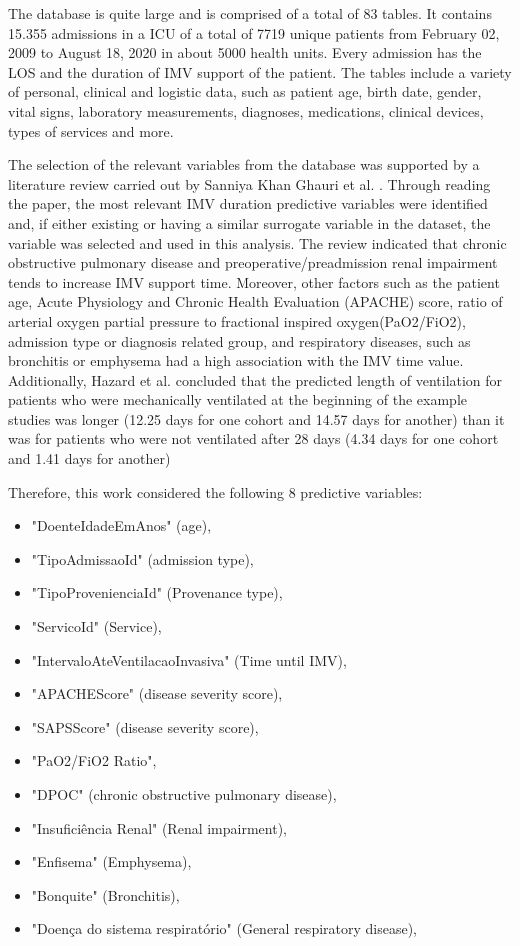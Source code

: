 \documentclass[journal]{IEEEtran} %
\begin{document}
The database is quite large and is comprised of a total of 83 tables. It contains 15.355 admissions in a ICU of a total of 7719 unique patients from February 02, 2009 to August 18, 2020 in about 5000 health units. Every admission has the LOS and the duration of IMV support of the patient. The tables include a variety of personal, clinical and logistic data, such as patient age, birth date, gender, vital signs, laboratory measurements, diagnoses, medications, clinical devices, types of services and more.

The selection of the relevant variables from the database was supported by a literature review carried out by Sanniya Khan Ghauri et al. \cite{Ghauri2019}. Through reading the paper, the most relevant IMV duration predictive variables were identified and, if either existing or having a similar surrogate variable in the dataset, the variable was selected and used in this analysis. The review indicated that chronic obstructive pulmonary disease and preoperative/preadmission renal impairment tends to increase IMV support time. Moreover, other factors such as the patient age, Acute Physiology and Chronic Health Evaluation (APACHE) score, ratio of arterial oxygen partial pressure to fractional inspired oxygen(PaO2/FiO2), admission type or diagnosis related group, and respiratory diseases, such as bronchitis or emphysema had a high association with the IMV time value. Additionally, Hazard et al. \cite{Hazard2020} concluded that the predicted length of ventilation for patients who were mechanically ventilated at the beginning of the example studies was longer (12.25 days for one cohort and 14.57 days for another) than it was for patients who were not ventilated after 28 days (4.34 days for one cohort and 1.41 days for another)

Therefore, this work considered the following 8 predictive variables:
\begin{itemize}
    \item "DoenteIdadeEmAnos" (age), 
    \item "TipoAdmissaoId" (admission type), 
    \item "TipoProvenienciaId" (Provenance type), 
    \item "ServicoId" (Service), 
    \item  "IntervaloAteVentilacaoInvasiva" (Time until IMV),
    \item "APACHEScore" (disease severity score), 
    \item "SAPSScore" (disease severity score), 
    \item "PaO2/FiO2 Ratio", 
    \item "DPOC" (chronic obstructive pulmonary disease), 
    \item "Insuficiência Renal" (Renal impairment), 
    \item "Enfisema" (Emphysema), 
    \item "Bonquite" (Bronchitis),
    \item "Doença do sistema respiratório" (General respiratory disease),
\end{itemize}
\end{document}
